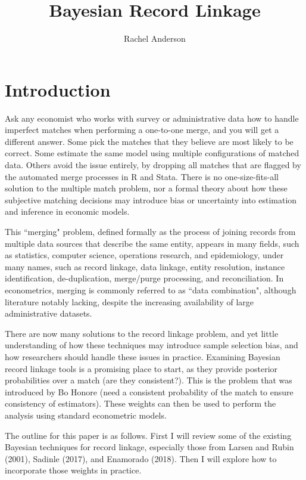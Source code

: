 \documentclass[11pt,reqno]{amsart}
\title{Bayesian Record Linkage}
\author{Rachel Anderson}
\begin{document}
\vspace*{-1cm}
\maketitle

\section{Introduction}

Ask any economist who works with survey or administrative data how to handle imperfect matches when performing a one-to-one merge, and you will get a different answer.  Some pick the matches that they believe are most likely to be correct.  Some estimate the same model using multiple configurations of matched data.  Others avoid the issue entirely, by dropping all matches that are flagged by the automated merge processes in R and Stata.  There is no one-size-fits-all solution to the multiple match problem, nor a formal theory about how these subjective matching decisions may introduce bias or uncertainty into estimation and inference in economic models. 

This ``merging" problem, defined formally as the process of joining records from multiple data sources that describe the same entity, appears in many fields, such as statistics, computer science, operations research, and epidemiology, under many names, such as record linkage, data linkage, entity resolution, instance identification, de-duplication, merge/purge processing, and reconciliation.    In econometrics, merging is commonly referred to as ``data combination", although literature notably lacking, despite the increasing availability of large administrative datasets.  %

There are now many solutions to the record linkage problem, and yet little understanding of how these techniques may introduce sample selection bias, and how researchers should handle these issues in practice.  Examining Bayesian record linkage tools is a promising place to start, as they provide posterior probabilities over a match (are they consistent?).  This is the problem that was introduced by Bo Honore (need a consistent probability of the match to ensure consistency of estimators).  These weights can then be used to perform the analysis using standard econometric models. 

The outline for this paper is as follows.  First I will review some of the existing Bayesian techniques for record linkage, especially those from Larsen and Rubin (2001), Sadinle (2017), and  Enamorado (2018).  Then I will explore how to incorporate those weights in practice.  
\end{document}
